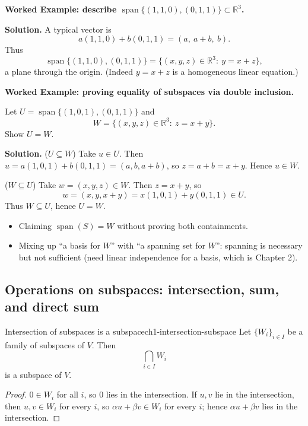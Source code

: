 \begin{examplebox}
\textbf{Worked Example: describe $\operatorname{span}\{(1,1,0),(0,1,1)\}\subset\mathbb{R}^3$.}

\medskip
\textbf{Solution.}
A typical vector is
\[
a(1,1,0)+b(0,1,1)=(a,\ a+b,\ b).
\]
Thus
\[
\operatorname{span}\{(1,1,0),(0,1,1)\}=\{(x,y,z)\in\mathbb{R}^3:\ y=x+z\},
\]
a plane through the origin. (Indeed $y=x+z$ is a homogeneous linear equation.)
\end{examplebox}

\begin{examplebox}
\textbf{Worked Example: proving equality of subspaces via double inclusion.}

Let $U=\operatorname{span}\{(1,0,1),(0,1,1)\}$ and
\[
W=\{(x,y,z)\in\mathbb{R}^3:\ z=x+y\}.
\]
Show $U=W$.

\medskip
\textbf{Solution.}
($U\subseteq W$) Take $u\in U$. Then $u=a(1,0,1)+b(0,1,1)=(a,b,a+b)$, so $z=a+b=x+y$. Hence $u\in W$.

($W\subseteq U$) Take $w=(x,y,z)\in W$. Then $z=x+y$, so
\[
w=(x,y,x+y)=x(1,0,1)+y(0,1,1)\in U.
\]
Thus $W\subseteq U$, hence $U=W$.
\end{examplebox}

\begin{commonmistake}
\begin{itemize}
\item Claiming $\operatorname{span}(S)=W$ without proving both containments.
\item Mixing up “a basis for $W$” with “a spanning set for $W$”: spanning is necessary but not sufficient (need linear independence for a basis, which is Chapter 2).
\end{itemize}
\end{commonmistake}


\subsection{Operations on subspaces: intersection, sum, and direct sum}


\begin{theorem}{Intersection of subspaces is a subspace}{ch1-intersection-subspace}
Let $\{W_i\}_{i\in I}$ be a family of subspaces of $V$. Then
\[
\bigcap_{i\in I} W_i
\]
is a subspace of $V$.
\begin{proof}
$0\in W_i$ for all $i$, so $0$ lies in the intersection. If $u,v$ lie in the intersection, then $u,v\in W_i$ for every $i$, so $\alpha u+\beta v\in W_i$ for every $i$; hence $\alpha u+\beta v$ lies in the intersection.
\end{proof}
\end{theorem}

